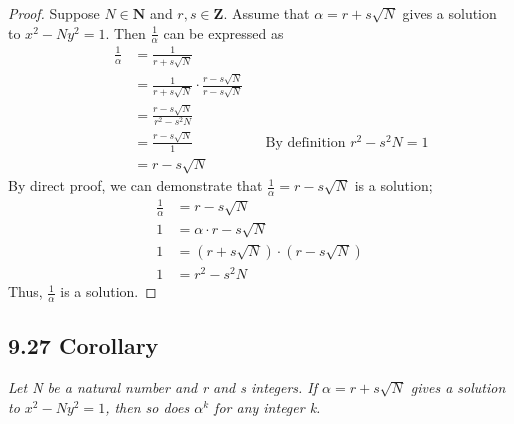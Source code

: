 \documentclass{article}
\begin{document}
\begin{proof}
Suppose $N \in \mathbf{N}$ and $r,s \in \mathbf{Z}$. Assume that $\alpha = r+s\sqrt{N}$ gives a solution to $x^2 - Ny^2 = 1$. Then $\frac{1}{\alpha}$ can be expressed as
\begin{align*}
    && \frac{1}{\alpha} &= \frac{1}{r+s\sqrt{N}}&&\\
    &&                  &= \frac{1}{r+s\sqrt{N}} \cdot \frac{r-s\sqrt{N}}{r-s\sqrt{N}}&&\\
    &&                  &= \frac{r-s\sqrt{N}}{r^2-s^2N}&&\\
    &&                  &= \frac{r-s\sqrt{N}}{1}&& \text{By definition $r^2-s^2N = 1$}\\
    &&                  &= r-s\sqrt{N}&&
\end{align*}
By direct proof, we can demonstrate that $\frac{1}{\alpha} = r-s\sqrt{N}$ is a solution;
\begin{align*}
    &&\frac{1}{\alpha} &= r-s\sqrt{N} &&\\
    &&1 &= \alpha \cdot r-s\sqrt{N} &&\\
    &&1 &= (r+s\sqrt{N}) \cdot (r-s\sqrt{N}) &&\\
    &&1 &= r^2-s^2N &&
\end{align*}
Thus, $\frac{1}{\alpha}$ is a solution. 
\end{proof}

\subsection*{9.27 Corollary} 
\quad \textit{Let N be a natural number and r and s integers. If $\alpha = r+s\sqrt{N}$ gives a solution to $x^2 - Ny^2 = 1$, then so does $\alpha^k$ for any integer k.}
\end{document}
